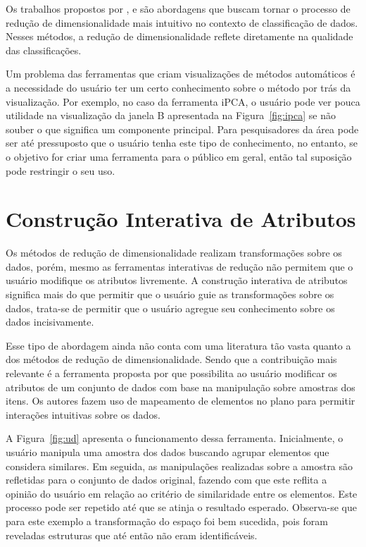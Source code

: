 Os trabalhos propostos por \citet{Zhang2006}, \citet{Choo2010}
e \citet{Paiva2012} são abordagens que buscam tornar o
processo de redução de dimensionalidade mais intuitivo no
contexto de classificação de dados. Nesses métodos, a redução
de dimensionalidade reflete diretamente na qualidade das
classificações. 

Um problema das ferramentas que criam visualizações de métodos
automáticos é a necessidade do usuário ter um certo
conhecimento sobre o método por trás da visualização. Por
exemplo, no caso da ferramenta iPCA, o usuário pode ver
pouca utilidade na visualização da janela B apresentada na
Figura~\ref{fig:ipca} se não souber o que significa um
componente principal. Para pesquisadores da área pode ser
até pressuposto que o usuário tenha este tipo de
conhecimento, no entanto, se o objetivo for criar uma
ferramenta para o público em geral, então tal suposição pode
restringir o seu uso.

\section{Construção Interativa de Atributos}\label{sec:tr}

Os métodos de redução de dimensionalidade realizam
transformações sobre os dados, porém, mesmo as ferramentas
interativas de redução não permitem que o usuário modifique
os atributos livremente. A construção interativa de
atributos significa mais do que permitir que o usuário guie
as transformações sobre os dados, trata-se de permitir que o
usuário agregue seu conhecimento sobre os dados
incisivamente.


Esse tipo de abordagem ainda não conta com uma literatura
tão vasta quanto a dos métodos de redução de
dimensionalidade. Sendo que a contribuição mais relevante é a
ferramenta proposta por \citet{Gladys2013} que possibilita ao
usuário modificar os atributos de um conjunto de dados com
base na manipulação sobre amostras dos itens. Os autores
fazem uso de mapeamento de elementos no plano para permitir
interações intuitivas sobre os dados. 

A Figura~\ref{fig:ud} apresenta  o funcionamento dessa
ferramenta. Inicialmente, o usuário manipula uma amostra dos
dados buscando  agrupar elementos que considera similares.
Em seguida, as manipulações realizadas sobre a amostra são
refletidas para o conjunto de dados original, fazendo com
que este reflita a opinião do usuário em relação ao critério
de similaridade entre os elementos. Este processo pode ser
repetido até que se atinja o resultado esperado.  Observa-se
que para este exemplo a transformação do espaço foi bem
sucedida, pois foram reveladas estruturas que até então não
eram identificáveis.

